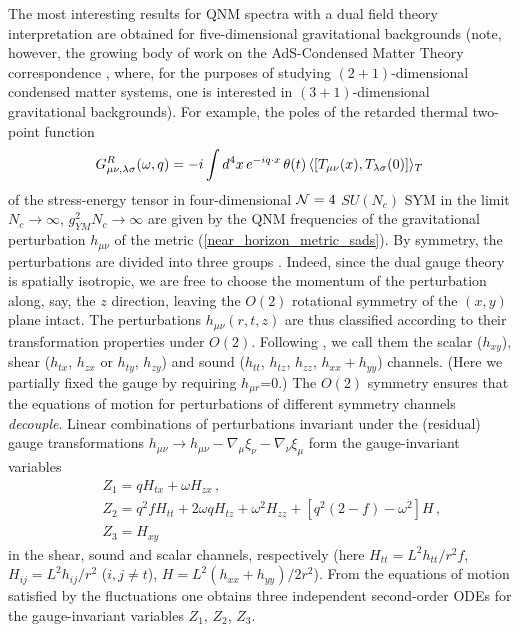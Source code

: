\documentclass[]{iopart}
\def\be{\begin{equation}}
\def\ee{\end{equation}}
\begin{document}
The most interesting results for QNM spectra with a dual field theory
interpretation are obtained for five-dimensional gravitational backgrounds
(note, however, the growing body of work on the AdS-Condensed Matter Theory
correspondence \cite{Hartnoll:2009sz, Herzog:2009xv}, where, for the purposes
of studying $(2+1)$-dimensional condensed matter systems, one is interested in
$(3+1)$-dimensional gravitational backgrounds).
%
For example, the poles of the retarded thermal two-point function
%
\be
G^R_{\mu\nu,\lambda\sigma} (\omega,q)  = -i \int d^4 x\, 
 e^{-i q\cdot x} \, \theta (t)\, 
 \langle \left[ T_{\mu\nu}(x),
T_{\lambda\sigma}(0)\right]\rangle_{\tiny T}
\ee
%
of the stress-energy tensor in four-dimensional ${\cal N}=4$ $SU(N_c)$ SYM in
the limit $N_c\rightarrow \infty$, $g^2_{YM}N_c \rightarrow \infty$ are given
by the QNM frequencies of the gravitational perturbation $h_{\mu\nu}$ of the
metric (\ref{near_horizon_metric_sads}). By symmetry, the perturbations are
divided into three groups \cite{Policastro:2002se, Kovtun:2005ev}. Indeed,
since the dual gauge theory is spatially isotropic, we are free to choose the
momentum of the perturbation along, say, the $z$ direction, leaving the $O(2)$
rotational symmetry of the $(x,y)$ plane intact.  The perturbations
$h_{\mu\nu}(r,t,z)$ are thus classified according to their transformation
properties under $O(2)$.  Following \cite{Policastro:2002se, Kovtun:2005ev},
we call them the scalar ($h_{xy}$), shear ($h_{tx}$, $h_{zx}$ or $h_{ty}$,
$h_{zy}$) and sound ($h_{tt}$, $h_{tz}$, $h_{zz}$, $h_{xx}+h_{yy}$) channels.
(Here we partially fixed the gauge by requiring $h_{\mu r}$=0.)  The $O(2)$
symmetry ensures that the equations of motion for perturbations of different
symmetry channels {\it decouple}.  Linear combinations of perturbations
invariant under the (residual) gauge transformations $h_{\mu\nu}\rightarrow
h_{\mu\nu} - \nabla_\mu\xi_\nu -\nabla_\nu\xi_\mu$ form the gauge-invariant
variables
%
\begin{eqnarray}
   &\,& 
    Z_1 = q H_{tx} + \omega H_{zx}\,,\label{l2}
\label{l1}\\
    &\,& 
    Z_2 = q^2 f H_{tt} + 2 \omega q H_{tz} +\omega^2 H_{zz} +
    \left[ q^2 \left( 2 - f\right) - \omega^2\right] H\,, \\
    &\,& 
    Z_3 = H_{xy}\,
\label{l3}
\end{eqnarray} 
%
in the shear, sound and scalar channels, respectively (here $H_{tt}=
L^2h_{tt}/r^2f$, $H_{ij}= L^2 h_{ij}/r^2$ ($i,j\neq t$),
$H=L^2(h_{xx}+h_{yy})/2r^2$). From the equations of motion satisfied by the
fluctuations one obtains three independent second-order ODEs for the
gauge-invariant variables $Z_1$, $Z_2$, $Z_3$.
%
\end{document}
